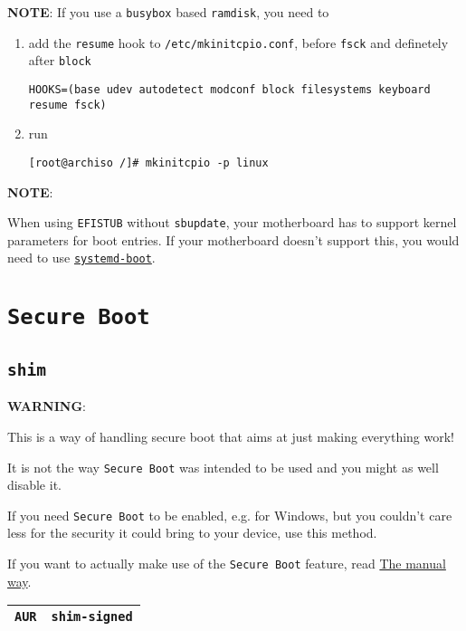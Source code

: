 \documentclass[9pt]{report}
\newcommand{\admonition}[2]{\textbf{#1}: {#2}}
\begin{document}
\admonition{NOTE}{If you use a \texttt{busybox} based \texttt{ramdisk}, you need to
}


\begin{enumerate}

\item{add the \texttt{resume} hook to \texttt{/etc/mkinitcpio.conf}, before \texttt{fsck} and definetely after \texttt{block}}

\begin{verbatim}
HOOKS=(base udev autodetect modconf block filesystems keyboard resume fsck)
\end{verbatim}
\item{run}

\begin{verbatim}
[root@archiso /]# mkinitcpio -p linux
\end{verbatim}
\end{enumerate}

\admonition{NOTE}{When using \texttt{EFISTUB} without \texttt{sbupdate}, your motherboard has to support kernel parameters for boot entries.
If your motherboard doesn’t support this, you would need to use \href{https://wiki.archlinux.org/index.php/Systemd-boot}{\texttt{systemd-boot}}.

}

\vfill\eject

\hypertarget{x-secure-boot}{\section{\texttt{Secure Boot}}}

\vfill\eject

\hypertarget{x-shim}{\subsection{\texttt{shim}}}
\admonition{WARNING}{This is a way of handling secure boot that aims at just making everything work!


It is not the way \texttt{Secure Boot} was intended to be used and you might as well disable it.


If you need \texttt{Secure Boot} to be enabled, e.g. for Windows, but you couldn’t care less for the security it could bring to your device, use this method.


If you want to actually make use of the \texttt{Secure Boot} feature, read \hyperlink{manual-secure-boot-setup}{The manual way}.

}
\begin{center}
\begin{tabular}{|c|c|}
\hline
\texttt{AUR} & \texttt{shim-signed} \\ 
\hline
\end{tabular}
\end{center}
\end{document}
